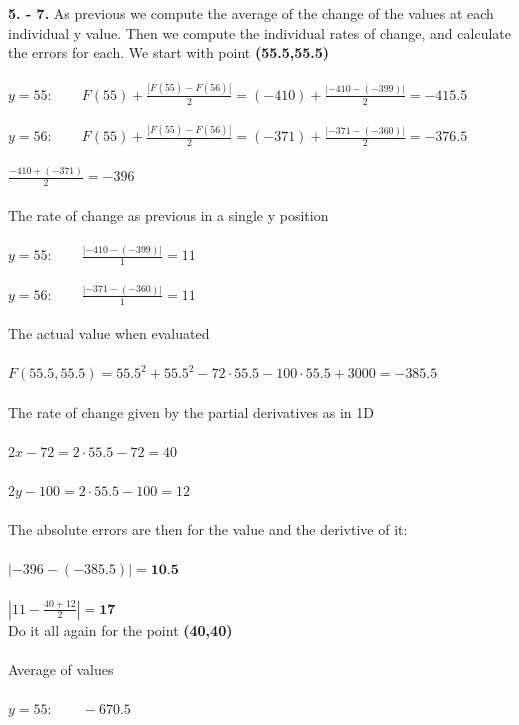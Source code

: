 \documentclass[]{article}
\begin{document}
\textbf{5. - 7.}
As previous we compute the average of the change of the values at each individual y value. Then we compute the individual rates of change, and calculate the errors for each. We start with point \textbf{(55.5,55.5)}\\\\
$y = 55 : \qquad F(55) + \frac{ |F(55) - F(56)| } {2} = (-410) + \frac{|-410 - (-399)|}{2} = -415.5$\\\\
$y = 56 : \qquad F(55) + \frac{ |F(55) - F(56)| } {2} = (-371) + \frac{|-371 - (-360)|}{2} = -376.5$\\\\
$ \frac{-410 + (-371)} {2} = -396 $\\\\
The rate of change as previous in a single y position\\\\
$ y = 55 : \qquad \frac{|-410 - (-399)|}{1} = 11 $\\\\
$ y = 56 : \qquad \frac{|-371 - (-360)|}{1} = 11$\\\\
The actual value when evaluated\\\\
$ F(55.5,55.5) = 55.5^2 + 55.5^2 - 72 \cdot 55.5 - 100 \cdot 55.5 + 3000 =  -385.5$\\\\
The rate of change given by the partial derivatives as in 1D\\\\
$ 2x - 72 = 2 \cdot 55.5 - 72  = 40$\\\\
$ 2y - 100 = 2 \cdot 55.5 - 100  = 12$\\\\
The absolute errors are then for the value and the derivtive of it:\\\\
$|-396 - (-385.5)| = \textbf{10.5} $\\\\
$|11 - \frac{40 + 12}{2}| = \textbf{17}$
\vspace{1cm}\\
Do it all again for the point \textbf{(40,40)}\\\\
Average of values\\\\
$ y = 55 : \qquad -670.5$\\\\
\end{document}
